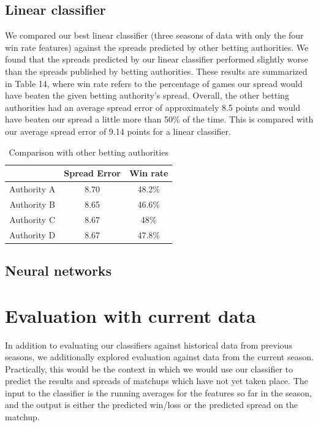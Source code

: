 \documentclass{article}
\begin{document}
\subsection{Linear classifier}
We compared our best linear classifier (three seasons of data with only the four win rate features) against the spreads predicted by other betting authorities. We found that the spreads predicted by our linear classifier performed slightly worse than the spreads published by betting authorities. These results are summarized in Table 14, where win rate refers to the percentage of games our spread would have beaten the given betting authority's spread. Overall, the other betting authorities had an average spread error of approximately 8.5 points and would have beaten our spread a little more than 50\% of the time. This is compared with our average spread error of 9.14 points for a linear classifier.

\begin{table}
  \begin{center}
    \begin{tabular}{ | c | c | c | }
      \hline
                       & Spread Error      & Win rate  \\ \hline
      Authority A      & 8.70              & 48.2\%    \\ \hline
      Authority B      & 8.65              & 46.6\%    \\ \hline
      Authority C      & 8.67              & 48\%      \\ \hline
      Authority D      & 8.67              & 47.8\%    \\ \hline
    \end{tabular}
  \end{center}
  \caption{Comparison with other betting authorities}
\end{table}

\subsection{Neural networks}


\section{Evaluation with current data}
In addition to evaluating our classifiers against historical data from previous seasons, we additionally explored evaluation against data from the current season. Practically, this would be the context in which we would use our classifier to predict the results and spreads of matchups which have not yet taken place. The input to the classifier is the running averages for the features so far in the season, and the output is either the predicted win/loss or the predicted spread on the matchup.
\end{document}
